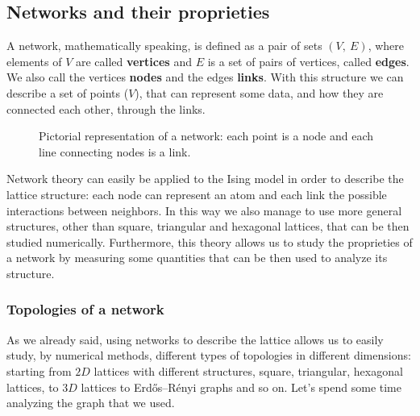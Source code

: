 \subsection{Networks and their proprieties}
A network, mathematically speaking, is defined as a pair of sets $(V,\ E)$, where elements of $V$ are called \textbf{vertices} and $E$ is a set of pairs of vertices, called \textbf{edges}. We also call the vertices \textbf{nodes} and the edges \textbf{links}. With this structure we can describe a set of points ($V$), that can represent some data, and how they are connected each other, through the links.
\begin{figure}[h]
    \centering
    \label{Fig:General Network}
    \caption{Pictorial representation of a network: each point is a node and each line connecting nodes is a link.}
\end{figure}  

Network theory can easily be applied to the Ising model in order to describe the lattice structure: each node can represent an atom and each link the possible interactions between neighbors. In this way we also manage to use more general structures, other than square, triangular and hexagonal lattices, that can be then studied numerically. Furthermore, this theory allows us to study the proprieties of a network by measuring some quantities that can be then used to analyze its structure.
\subsubsection{Topologies of a network}
As we already said, using networks to describe the lattice allows us to easily study, by numerical methods, different types of topologies in different dimensions: starting from $2D$ lattices with different structures, square, triangular, hexagonal lattices, to $3D$ lattices to Erdős–Rényi graphs and so on. Let's spend some time analyzing the graph that we used.

